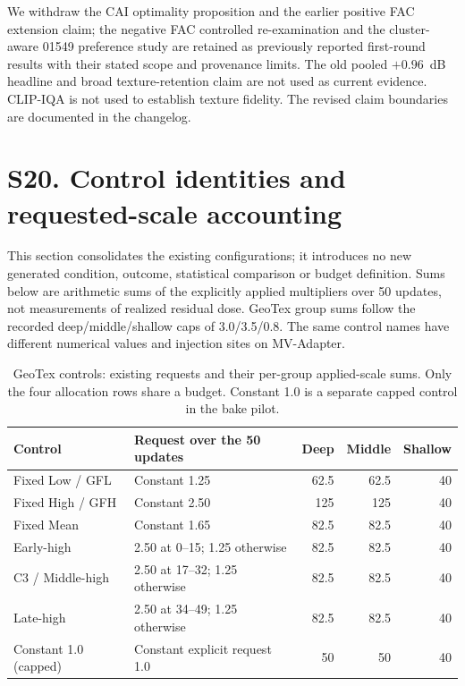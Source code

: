 \documentclass[11pt]{article}
\begin{document}
We withdraw the CAI optimality proposition and the earlier positive FAC extension claim; the negative FAC controlled re-examination and the cluster-aware 01549 preference study are retained as previously reported first-round results with their stated scope and provenance limits. The old pooled $+0.96$~dB headline and broad texture-retention claim are not used as current evidence. CLIP-IQA is not used to establish texture fidelity. The revised claim boundaries are documented in the changelog.


\clearpage
\section*{S20. Control identities and requested-scale accounting}
This section consolidates the existing configurations; it introduces no new generated condition, outcome, statistical comparison or budget definition. Sums below are arithmetic sums of the explicitly applied multipliers over 50 updates, not measurements of realized residual dose. GeoTex group sums follow the recorded deep/middle/shallow caps of 3.0/3.5/0.8. The same control names have different numerical values and injection sites on MV-Adapter.

\begin{table}[ht]
\centering\small
\caption{GeoTex controls: existing requests and their per-group applied-scale sums. Only the four allocation rows share a budget. Constant 1.0 is a separate capped control in the bake pilot.}\label{tab:control-identity-geotex}
\begin{tabular}{p{3.0cm}p{6.1cm}rrr}
\toprule Control & Request over the 50 updates & Deep & Middle & Shallow \\
\midrule
Fixed Low / GFL & Constant 1.25 & 62.5 & 62.5 & 40 \\
Fixed High / GFH & Constant 2.50 & 125 & 125 & 40 \\
Fixed Mean & Constant 1.65 & 82.5 & 82.5 & 40 \\
Early-high & 2.50 at 0--15; 1.25 otherwise & 82.5 & 82.5 & 40 \\
C3 / Middle-high & 2.50 at 17--32; 1.25 otherwise & 82.5 & 82.5 & 40 \\
Late-high & 2.50 at 34--49; 1.25 otherwise & 82.5 & 82.5 & 40 \\
Constant 1.0 (capped) & Constant explicit request 1.0 & 50 & 50 & 40 \\
\bottomrule\end{tabular}
\end{table}
\end{document}
